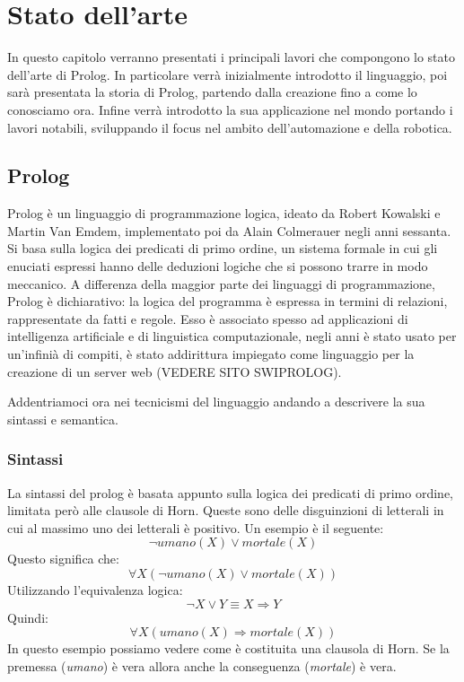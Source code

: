 \chapter{Stato dell'arte}
\label{cha:statoarte}
In questo capitolo verranno presentati i principali lavori che compongono lo stato
dell'arte di Prolog. In particolare verrà inizialmente introdotto il linguaggio, poi sarà presentata la storia di Prolog, partendo dalla creazione
fino a come lo conosciamo ora. Infine verrà introdotto la sua applicazione nel mondo portando i lavori notabili, sviluppando il focus nel ambito dell'automazione e della robotica.
\section{Prolog}
\label{sec:prolog}
Prolog è un linguaggio di programmazione logica, ideato da Robert Kowalski e Martin Van Emdem, implementato poi da Alain Colmerauer negli anni sessanta.
Si basa sulla logica dei predicati di primo ordine, un sistema formale in cui gli enuciati espressi hanno delle deduzioni logiche
che si possono trarre in modo meccanico.
A differenza della maggior parte dei linguaggi di programmazione, Prolog è dichiarativo: la logica del programma è espressa in termini di relazioni, rappresentate da fatti e regole.
Esso è associato spesso ad applicazioni di intelligenza artificiale e di linguistica computazionale, negli anni è stato usato per un'infinià di compiti,
è stato addirittura impiegato come linguaggio per la creazione di un server web (VEDERE SITO SWIPROLOG). 

Addentriamoci ora nei tecnicismi del linguaggio andando a descrivere la sua sintassi e semantica.
\subsection{Sintassi}
\label{subsec:sintassi}
La sintassi del prolog è basata appunto sulla logica dei predicati di primo ordine, limitata però alle clausole di Horn.
Queste sono delle disguinzioni di letterali in cui al massimo uno dei letterali è positivo. Un esempio è il seguente:
\begin{equation}
    \label{eq:clausolaHorn1}
    \neg umano(X) \lor mortale(X)
\end{equation}
Questo significa che:
\begin{equation}
    \label{eq:clausolaHorn2}
    \forall X ( \neg umano(X) \lor mortale(X) )
\end{equation}
Utilizzando l'equivalenza logica:
\begin{equation}
    \label{eq:clausolaHorn3}
    \neg X \lor Y \equiv X \Rightarrow Y
\end{equation}
Quindi:
\begin{equation}
    \label{eq:clausolaHorn4}
    \forall X ( umano(X) \Rightarrow mortale(X))
\end{equation}
In questo esempio possiamo vedere come è costituita una clausola di Horn. Se la premessa (\textit{umano}) è vera allora
anche la conseguenza (\textit{mortale}) è vera.

